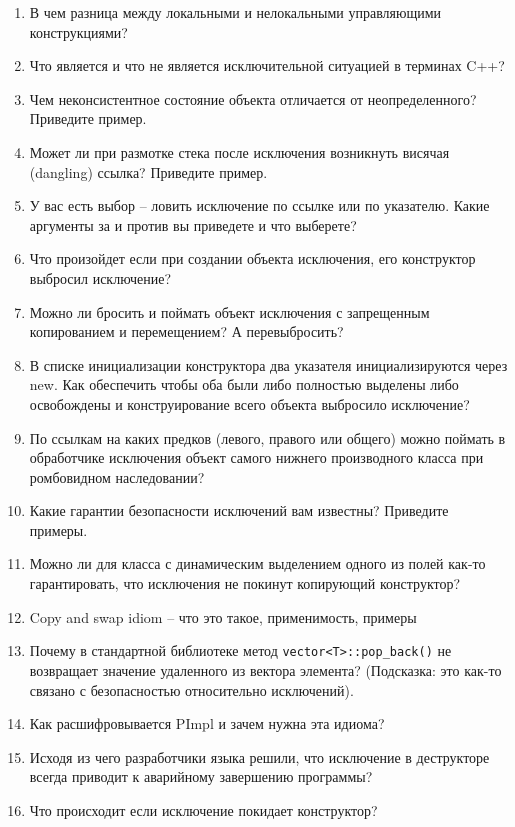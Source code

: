 \documentclass[a4paper,12pt,oneside]{article}
\begin{document}
\begin{enumerate}
\item В чем разница между локальными и нелокальными управляющими конструкциями?
\item Что является и что не является исключительной ситуацией в терминах C++?
\item Чем неконсистентное состояние объекта отличается от неопределенного? Приведите пример.
\item Может ли при размотке стека после исключения возникнуть висячая (dangling) ссылка? Приведите пример.
\item У вас есть выбор -- ловить исключение по ссылке или по указателю. Какие аргументы за и против вы приведете и что выберете?
\item Что произойдет если при создании объекта исключения, его конструктор выбросил исключение?
\item Можно ли бросить и поймать объект исключения с запрещенным копированием и перемещением? А перевыбросить?
\item В списке инициализации конструктора два указателя инициализируются через new. Как обеспечить чтобы оба были либо полностью выделены либо освобождены и конструирование всего объекта выбросило исключение?
\item По ссылкам на каких предков (левого, правого или общего) можно поймать в обработчике исключения объект самого нижнего производного класса при ромбовидном наследовании?
\item Какие гарантии безопасности исключений вам известны? Приведите примеры.
\item Можно ли для класса с динамическим выделением одного из полей как-то гарантировать, что исключения не покинут копирующий конструктор?
\item Copy and swap idiom -- что это такое, применимость, примеры
\item Почему в стандартной библиотеке метод \lstinline!vector<T>::pop_back()! не возвращает значение удаленного из вектора элемента? (Подсказка: это как-то связано с безопасностью относительно исключений).
\item Как расшифровывается PImpl и зачем нужна эта идиома?
\item Исходя из чего разработчики языка решили, что исключение в деструкторе всегда приводит к аварийному завершению программы?
\item Что происходит если исключение покидает конструктор?
\end{enumerate}
\end{document}
